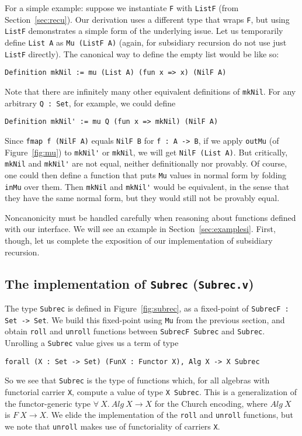 \documentclass[a4paper,USenglish]{lipics-v2021}
\begin{document}
For a simple example: suppose we instantiate \verb|F| with
\verb|ListF| (from Section~\ref{sec:recu}).  Our derivation uses a
different type that wraps \verb|F|, but using \verb|ListF|
demonstrates a simple form of the underlying issue.  Let us temporarily define \verb|List A| as
\verb|Mu (ListF A)| (again, for subsidiary recursion do not use just
\verb|ListF| directly).  The canonical way to define the empty list
would be like so:
\begin{verbatim}
Definition mkNil := mu (List A) (fun x => x) (NilF A)
\end{verbatim}
\noindent Note that there are infinitely many other equivalent
definitions of \verb|mkNil|.  For any arbitrary \verb|Q : Set|, for
example, we could define
\begin{verbatim}
Definition mkNil' := mu Q (fun x => mkNil) (NilF A)
\end{verbatim}
\noindent Since \verb|fmap f (NilF A)| equals \verb|NilF B| for
\verb|f : A -> B|, if we apply \verb|outMu| (of Figure~\ref{fig:mu})
to \verb|mkNil'| or \verb|mkNil|, we will get \verb|NilF (List A)|.
But critically, \verb|mkNil| and \verb|mkNil'| are not equal, neither
definitionally nor provably.  Of course, one could then define a
function that puts \verb|Mu| values in normal form by folding
\verb|inMu| over them.  Then \verb|mkNil| and \verb|mkNil'| would be
equivalent, in the sense that they have the same normal form, but they
would still not be provably equal.

Noncanonicity must be handled carefully when reasoning about functions
defined with our interface.  We will see an example in
Section~\ref{sec:examplesi}.  First, though, let us complete the
exposition of our implementation of subsidiary recursion.

\subsection{The implementation of \texttt{Subrec} (\texttt{Subrec.v})}
\label{sec:subrecimpl}

The type \verb|Subrec| is defined in Figure~\ref{fig:subrec}, as a
fixed-point of \verb|SubrecF : Set -> Set|.  We build this fixed-point
using \verb|Mu| from the previous section, and obtain \verb|roll|
and \verb|unroll| functions between \verb|SubrecF Subrec| and \verb|Subrec|.
Unrolling a \verb|Subrec| value gives us a term of type
\begin{verbatim}
forall (X : Set -> Set) (FunX : Functor X), Alg X -> X Subrec
\end{verbatim}
\noindent So we see that \verb|Subrec| is the type of functions which,
for all algebras with functorial carrier
\verb|X|, compute a value of type \verb|X Subrec|.  This is a
generalization of the functor-generic type
$\forall\ X.\ \textit{Alg}\ X \to X$ for the Church encoding, where
$\textit{Alg}\ X$ is $F\ X \to X$.  We elide the implementation of the
\verb|roll| and \verb|unroll| functions, but we note that \verb|unroll|
makes use of functoriality of carriers \verb|X|.
\end{document}
